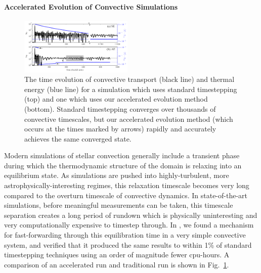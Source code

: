 \documentclass[preprint, hmargin=1in, vmargin=1in]{aastex62}
\begin{document}
\paragraph{Accelerated Evolution of Convective Simulations}
\begin{figure}
	\begin{center}
	\vspace{-11pt}
    \includegraphics[width=0.48\textwidth]{./figs/nu_v_time.png}
	\vspace{-16pt}
	\end{center}
    \caption{
	\citep[Fig.~2 of][]{anders&all2018} The time evolution of convective transport (black line) and thermal energy (blue line) for a simulation which uses standard timestepping (top) and one which uses our accelerated evolution method (bottom).
	Standard timestepping converges over thousands of convective timescales, but our accelerated evolution method (which occurs at the times marked by arrows) rapidly and accurately achieves the same converged state.
	\label{fig:ae_plot} }
	\vspace{-11pt}
\end{figure}
Modern simulations of stellar convection generally include a transient phase during which the thermodynamic structure of the domain is relaxing into an equilibrium state.
As simulations are pushed into highly-turbulent, more astrophysically-interesting regimes, this relaxation timescale becomes very long compared to the overturn timescale of convective dynamics.
In state-of-the-art simulations, before meaningful measurements can be taken, this timescale separation creates a long period of rundown which is physically uninteresting and very computationally expensive to timestep through.
In \citet{anders&all2018}, we found a mechanism for fast-forwarding through this equilibration time in a very simple convective system, and verified that it produced the same results to within 1\% of standard timestepping techniques using an order of magnitude fewer cpu-hours.
A comparison of an accelerated run and traditional run is shown in Fig.~\ref{fig:ae_plot}.
\end{document}
